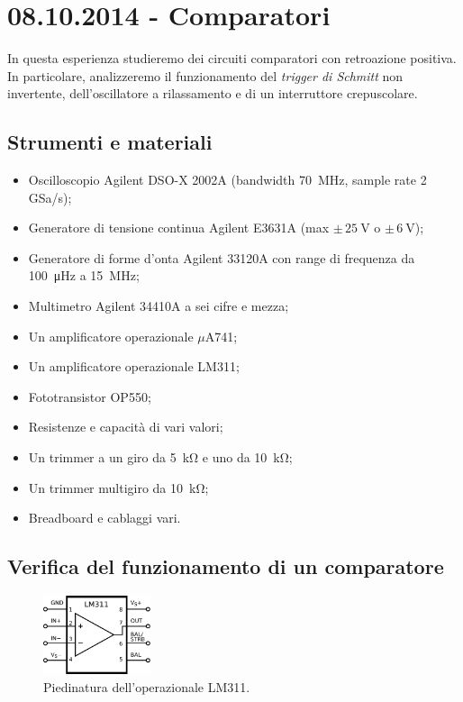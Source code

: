 \section{08.10.2014 - Comparatori}

In questa esperienza studieremo dei circuiti comparatori con retroazione positiva. In particolare, analizzeremo il funzionamento del \textit{trigger di Schmitt} non invertente, dell'oscillatore a rilassamento e di un interruttore crepuscolare.

\subsection*{Strumenti e materiali}

\begin{itemize} [noitemsep]
\item Oscilloscopio Agilent DSO-X 2002A (bandwidth \SI{70}{\mega\hertz}, sample rate \num{2} GSa/s);
\item Generatore di tensione continua Agilent E3631A (max $\pm \, \SI{25}{\volt}$ o $\pm \, \SI{6}{\volt}$);
\item Generatore di forme d'onta Agilent 33120A con range di frequenza da \SI{100}{\micro\hertz} a \SI{15}{\mega\hertz};
\item Multimetro Agilent 34410A a sei cifre e mezza;
\item Un amplificatore operazionale $\mu$A741;
\item Un amplificatore operazionale LM311;
\item Fototransistor OP550;
\item Resistenze e capacità di vari valori;
\item Un trimmer a un giro da \SI{5}{\kilo\ohm} e uno da \SI{10}{\kilo\ohm};
\item Un trimmer multigiro da \SI{10}{\kilo\ohm};
\item Breadboard e cablaggi vari.
\end{itemize}

\subsection{Verifica del funzionamento di un comparatore}

\begin{figure}
  \begin{center}
    \includegraphics[width=0.280\textwidth]{../E04/latex/LM311.pdf}
  \end{center}
  \caption{Piedinatura dell'operazionale LM311.}
  \label{cir4:piedinatura_LM311}
\end{figure}


